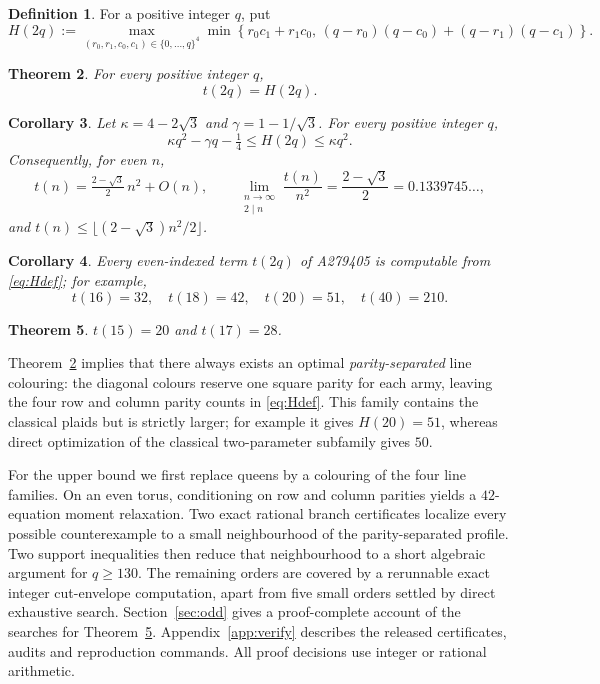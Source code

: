\documentclass[11pt]{amsart}
\newtheorem{theorem}{Theorem}
\newtheorem{corollary}[theorem]{Corollary}
\theoremstyle{definition}
\newtheorem{definition}[theorem]{Definition}
\theoremstyle{remark}
\begin{document}
\begin{definition}\label{def:H}
For a positive integer $q$, put
\begin{equation}\label{eq:Hdef}
H(2q):=
\max_{(r_0,r_1,c_0,c_1)\in\{0,\ldots,q\}^4}
\min\!\left\{r_0c_1+r_1c_0,\,
(q-r_0)(q-c_0)+(q-r_1)(q-c_1)\right\}.
\end{equation}
\end{definition}

\begin{theorem}\label{thm:main}
For every positive integer $q$,
\[
t(2q)=H(2q).
\]
\end{theorem}

\begin{corollary}\label{cor:asym}
Let $\kappa=4-2\sqrt3$ and $\gamma=1-1/\sqrt3$.  For every positive
integer $q$,
\[
\kappa q^2-\gamma q-\tfrac14\le H(2q)\le\kappa q^2.
\]
Consequently, for even $n$,
\[
t(n)=\tfrac{2-\sqrt3}{2}\,n^2+O(n),
\qquad
\lim_{\substack{n\to\infty\\2\mid n}}\frac{t(n)}{n^2}
=\frac{2-\sqrt3}{2}=0.1339745\ldots,
\]
and $t(n)\le\lfloor(2-\sqrt3)n^2/2\rfloor$.
\end{corollary}

\begin{corollary}\label{cor:values}
Every even-indexed term $t(2q)$ of A279405 is computable from \eqref{eq:Hdef}; for example,
\[
t(16)=32,\quad t(18)=42,\quad t(20)=51,\quad t(40)=210 .
\]
\end{corollary}

\begin{theorem}\label{thm:oddmain}
$t(15)=20$ and $t(17)=28$.
\end{theorem}

Theorem~\ref{thm:main} implies that there always exists an optimal
\emph{parity-separated} line colouring: the diagonal colours reserve one
square parity for each army, leaving the four row and column parity counts in
\eqref{eq:Hdef}.  This family contains the classical plaids but is strictly
larger; for example it gives $H(20)=51$, whereas direct optimization of the
classical two-parameter subfamily gives $50$.

For the upper bound we first replace queens by a colouring of the four line
families.  On an even torus, conditioning on row and column parities yields a
$42$-equation moment relaxation.  Two exact rational branch certificates
localize every possible counterexample to a small neighbourhood of the
parity-separated profile.  Two support inequalities then reduce that
neighbourhood to a short algebraic argument for $q\ge130$.  The remaining
orders are covered by a rerunnable exact integer cut-envelope computation,
apart from five small orders settled by direct exhaustive search.
Section~\ref{sec:odd} gives a proof-complete account of the searches for
Theorem~\ref{thm:oddmain}.
Appendix~\ref{app:verify} describes the released certificates, audits and
reproduction commands.  All proof decisions use integer or rational
arithmetic.
\end{document}
